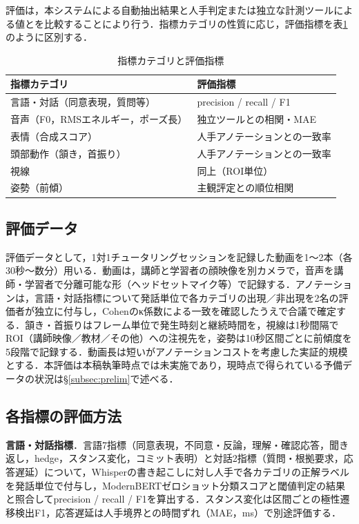 \documentclass[Japanese]{dicomopapers}
\begin{document}
評価は，本システムによる自動抽出結果と人手判定または独立な計測ツールによる値とを比較することにより行う．指標カテゴリの性質に応じ，評価指標を表\ref{tab:eval_method}のように区別する．

\begin{table}[t]
\centering
\caption{指標カテゴリと評価指標}
\label{tab:eval_method}
\footnotesize
\setlength{\tabcolsep}{3pt}
\begin{tabular}{@{}p{}p{}@{}}
\hline
指標カテゴリ & 評価指標 \\
\hline
言語・対話（同意表現，質問等） & precision / recall / F1 \\
音声（F0，RMSエネルギー，ポーズ長） & 独立ツールとの相関・MAE \\
表情（合成スコア） & 人手アノテーションとの一致率 \\
頭部動作（頷き，首振り） & 人手アノテーションとの一致率 \\
視線 & 同上（ROI単位） \\
姿勢（前傾） & 主観評定との順位相関 \\
\hline
\end{tabular}
\end{table}

\subsection{評価データ}

評価データとして，1対1チュータリングセッションを記録した動画を1〜2本（各30秒〜数分）用いる．動画は，講師と学習者の顔映像を別カメラで，音声を講師・学習者で分離可能な形（ヘッドセットマイク等）で記録する．アノテーションは，言語・対話指標について発話単位で各カテゴリの出現／非出現を2名の評価者が独立に付与し，Cohenのκ係数による一致を確認したうえで合議で確定する．頷き・首振りはフレーム単位で発生時刻と継続時間を，視線は1秒間隔でROI（講師映像／教材／その他）への注視先を，姿勢は10秒区間ごとに前傾度を5段階で記録する．動画長は短いがアノテーションコストを考慮した実証的規模とする．本評価は本稿執筆時点では未実施であり，現時点で得られている予備データの状況は\S\ref{subsec:prelim}で述べる．

\subsection{各指標の評価方法}

\textbf{言語・対話指標}．言語7指標（同意表現，不同意・反論，理解・確認応答，聞き返し，hedge，スタンス変化，コミット表明）と対話2指標（質問・根拠要求，応答遅延）について，Whisperの書き起こしに対し人手で各カテゴリの正解ラベルを発話単位で付与し，ModernBERTゼロショット分類スコアと閾値判定の結果と照合してprecision / recall / F1を算出する．スタンス変化は区間ごとの極性遷移検出F1，応答遅延は人手境界との時間ずれ（MAE，ms）で別途評価する．
\end{document}
